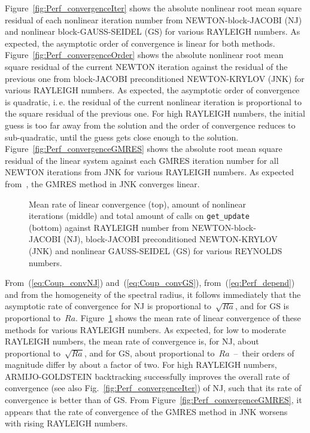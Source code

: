 \documentclass[10pt, ngerman, english,
twoside, open=right,
numbers=noenddot,
declaration=section,
abstract=section,
abstract=multiple,
abstract=notoc,
declaration=notoc,
cd=pale, 
chapterprefix=off, 
chapterpage=false, 
headingsvskip=-10em,
cdgeometry=custom, 
slantedgreek=on,
cdmath=on, 
cdfont=on,
ttfont=false,
mathswap=off,
]{tudscrreprt}
\numberwithin{equation}{chapter}
\renewcommand{\textsc}[1]{\uppercase{\mbox{#1}}}
\newcommand{\sidenote}[1]{
  \leavevmode %
  \marginpar{\hyphenpenalty=1000 \flushleft{\textcolor{HKS41}{#1}}}}
\begin{document}
\sidenote{Order}Figure~\ref{fig:Perf_convergenceIter} shows the absolute nonlinear root mean square residual of each nonlinear iteration number from \textsc{Newton}-block-\textsc{Jacobi} (NJ) and nonlinear block-\textsc{Gau\ss}-\textsc{Seidel} (GS) for various \textsc{Rayleigh} numbers. As expected, the asymptotic order of convergence is linear for both methods. 
Figure~\ref{fig:Perf_convergenceOrder} shows the absolute nonlinear root mean square residual of the current \textsc{Newton} iteration against the residual of the previous one from block-\textsc{Jacobi} preconditioned \textsc{Newton}-\textsc{Krylov} (JNK) for various \textsc{Rayleigh} numbers. As expected, the asymptotic order of convergence is quadratic, i.\,e. the residual of the current nonlinear iteration is proportional to the square residual of the previous one. For high \textsc{Rayleigh} numbers, the initial guess is too far away from the solution and the order of convergence reduces to sub-quadratic, until the guess gets close enough to the solution. Figure~\ref{fig:Perf_convergenceGMRES} shows the absolute root mean square residual of the linear system against each GMRES iteration number for all \textsc{Newton} iterations from JNK for various \textsc{Rayleigh} numbers. As expected from~\cite[see][Th.~5]{GMRES}, the GMRES method in JNK converges linear.\par
\begin{figure}[!p]
\centering

\caption{Mean rate of linear convergence (top), amount of nonlinear iterations (middle) and total amount of calls on \texttt{get\_update} (bottom) against \textsc{Rayleigh} number from \textsc{Newton}-block-\textsc{Jacobi} (NJ), block-\textsc{Jacobi} preconditioned \textsc{Newton}-\textsc{Krylov} (JNK) and nonlinear \textsc{Gau\ss}-\textsc{Seidel} (GS) for various \textsc{Reynolds} numbers.}\label{fig:Perf_iter}
\end{figure}
\sidenote{Rate}From~(\ref{eq:Coup_convNJ}) and~(\ref{eq:Coup_convGS}), from~(\ref{eq:Perf_depend}) and from the homogeneity of the spectral radius, it follows immediately that the asymptotic rate of convergence for NJ is proportional to~$\sqrt{Ra}$, and for GS is proportional to~$Ra$.
Figure~\ref{fig:Perf_iter} shows the mean rate of linear convergence of these methods for various \textsc{Rayleigh} numbers. As expected, for low to moderate \textsc{Rayleigh} numbers, the mean rate of convergence is, for NJ, about proportional to~$\sqrt{Ra}$, and for GS, about proportional to~$Ra$~--~their orders of magnitude differ by about a factor of two.
For high \textsc{Rayleigh} numbers, \textsc{Armijo}-\textsc{Goldstein} backtracking successfully improves the overall rate of convergence (see also Fig.~\ref{fig:Perf_convergenceIter}) of NJ, such that its rate of convergence is better than of GS. From Figure~\ref{fig:Perf_convergenceGMRES}, it appears that the rate of convergence of the GMRES method in JNK worsens with rising \textsc{Rayleigh} numbers.\par
\end{document}
